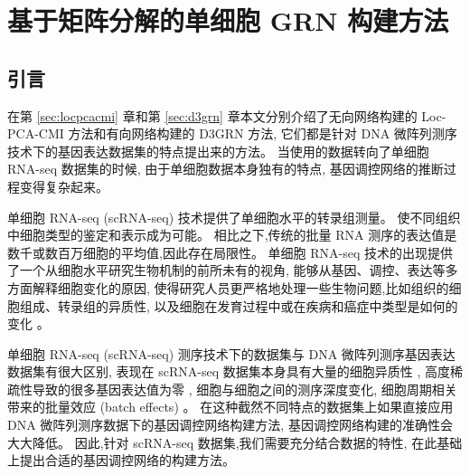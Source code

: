 \section{基于矩阵分解的单细胞 GRN 构建方法}
\label{sec:scgrnhunter}

\subsection{引言}

在第 \ref{sec:locpcacmi} 章和第 \ref{sec:d3grn} 章本文分别介绍了无向网络构建的 Loc-PCA-CMI 方法和有向网络构建的 D3GRN 方法, 
它们都是针对 DNA 微阵列测序技术下的基因表达数据集的特点提出来的方法。
当使用的数据转向了单细胞 RNA-seq 数据集的时候, 由于单细胞数据本身独有的特点, 基因调控网络的推断过程变得复杂起来。

单细胞 RNA-seq (scRNA-seq) 技术提供了单细胞水平的转录组测量。
使不同组织中细胞类型的鉴定和表示成为可能。
相比之下,传统的批量 RNA 测序的表达值是数千或数百万细胞的平均值,因此存在局限性。
单细胞 RNA-seq 技术的出现提供了一个从细胞水平研究生物机制的前所未有的视角,
能够从基因、调控、表达等多方面解释细胞变化的原因,
使得研究人员更严格地处理一些生物问题,比如组织的细胞组成、转录组的异质性,
以及细胞在发育过程中或在疾病和癌症中类型是如何的变化 \cite{kumar2017understanding,patel2014single}。

单细胞 RNA-seq (scRNA-seq) 测序技术下的数据集与 DNA 微阵列测序基因表达数据集有很大区别, 
表现在 scRNA-seq 数据集本身具有大量的细胞异质性 \cite{wagner2016revealing},
高度稀疏性导致的很多基因表达值为零 \cite{vallejos2017normalizing},
细胞与细胞之间的测序深度变化, 细胞周期相关带来的批量效应 (batch effects) \cite{buettner2015computational}。
在这种截然不同特点的数据集上如果直接应用 DNA 微阵列测序数据下的基因调控网络构建方法,
基因调控网络构建的准确性会大大降低。
%
因此,针对 scRNA-seq 数据集,我们需要充分结合数据的特性,
在此基础上提出合适的基因调控网络的构建方法。

